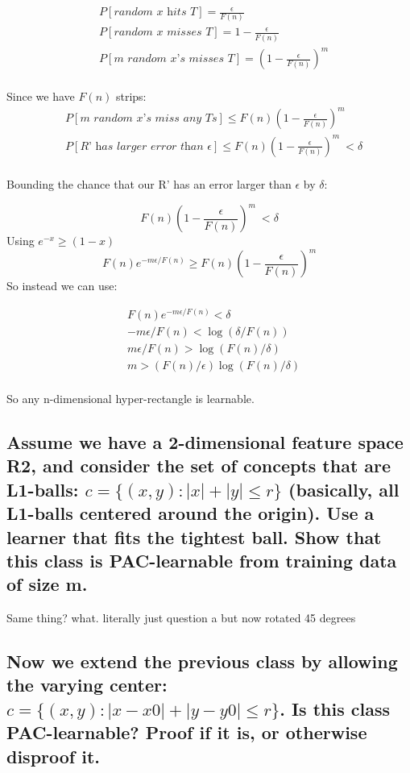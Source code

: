 \documentclass[11pt,a4paper]{article}
\begin{document}
\begin{align*} 
    &P[\textit{random x hits T}] = \frac{\epsilon}{F(n)} \\
    &P[\textit{random x misses T}] = 1 - \frac{\epsilon}{F(n)} \\
    &P[\textit{m random x's misses T}] = (1 - \frac{\epsilon}{F(n)})^m \\
\end{align*}

Since we have $F(n)$ strips:
\begin{align*} 
    &P[\textit{m random x's miss any Ts}] \leq F(n) (1 - \frac{\epsilon}{F(n)})^m \\
    &P[\textit{R' has larger error than } \epsilon] \leq F(n) (1 - \frac{\epsilon}{F(n)})^m\ < \delta \\
\end{align*}

Bounding the chance that our R' has an error larger than $\epsilon$ by $\delta$:

\[F(n) (1 - \frac{\epsilon}{F(n)})^m\ < \delta\]
Using $e^{-x} \geq (1-x)$
\[F(n)e^{-m\epsilon / F(n)} \geq F(n)(1 - \frac{\epsilon}{F(n)})^m\]
So instead we can use:

\begin{align*} 
    &F(n)e^{-m\epsilon / F(n)} < \delta \\ 
    &-m\epsilon / F(n) < \log{(\delta / F(n))} \\
    &m\epsilon / F(n) > \log{(F(n) / \delta)} \\
    &m > (F(n) / \epsilon)\log{(F(n) / \delta)} \\
\end{align*}

So any n-dimensional hyper-rectangle is learnable.

\subsection{Assume we have a 2-dimensional feature space R2, and consider the set of concepts that are L1-balls: $c = \{(x, y) : |x| + |y| ≤ r\}$ (basically, all L1-balls centered around the origin). Use a learner that fits the tightest ball. Show that this class is PAC-learnable from training data of size m.}
\label{sec:2b}

Same thing? what. literally just question a but now rotated 45 degrees

\subsection{Now we extend the previous class by allowing the varying center: $c = \{(x, y) : |x − x0| + |y − y0| ≤ r\}$. Is this class PAC-learnable? Proof if it is, or otherwise disproof it.}
\label{sec:2c}
\end{document}
